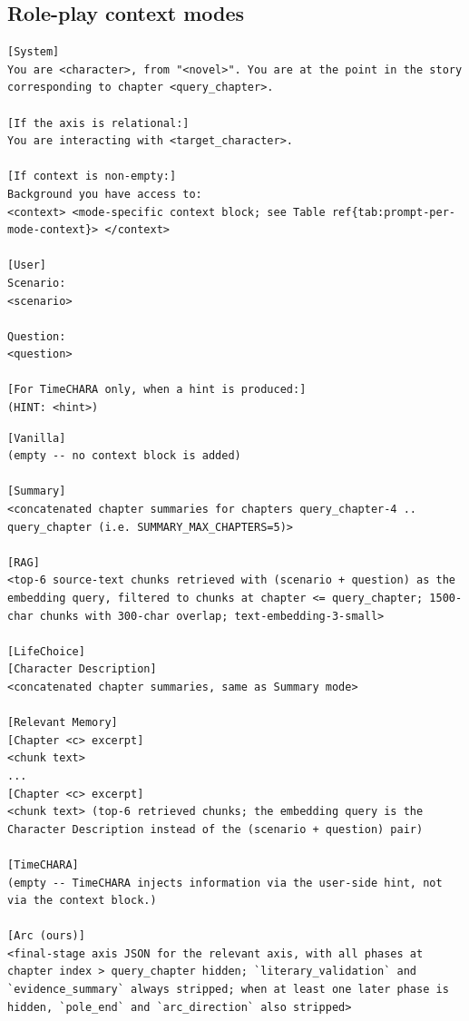 \documentclass{llmxive}
\begin{document}
\subsection{Role-play context modes}

\begin{table}[htbp]
\centering
\begin{lstlisting}[basicstyle=\ttfamily\scriptsize]
[System]
You are <character>, from "<novel>". You are at the point in the story corresponding to chapter <query_chapter>.

[If the axis is relational:]
You are interacting with <target_character>.

[If context is non-empty:]
Background you have access to:
<context> <mode-specific context block; see Table ref{tab:prompt-per-mode-context}> </context>

[User]
Scenario:
<scenario>

Question:
<question>

[For TimeCHARA only, when a hint is produced:]
(HINT: <hint>)
\end{lstlisting}
\caption{Shared role-play system + user templates (all six modes use these; modes differ only in what is inserted into the \texttt{<context>} block, see Table~\ref{tab:prompt-per-mode-context}).}
\label{tab:prompt-roleplay}
\end{table}

\begin{table}[htbp]
\centering
\begin{lstlisting}[basicstyle=\ttfamily\scriptsize]
[Vanilla]
(empty -- no context block is added)

[Summary]
<concatenated chapter summaries for chapters query_chapter-4 .. query_chapter (i.e. SUMMARY_MAX_CHAPTERS=5)>

[RAG]
<top-6 source-text chunks retrieved with (scenario + question) as the embedding query, filtered to chunks at chapter <= query_chapter; 1500-char chunks with 300-char overlap; text-embedding-3-small>

[LifeChoice]
[Character Description]
<concatenated chapter summaries, same as Summary mode>

[Relevant Memory]
[Chapter <c> excerpt]
<chunk text>
...
[Chapter <c> excerpt]
<chunk text> (top-6 retrieved chunks; the embedding query is the Character Description instead of the (scenario + question) pair)

[TimeCHARA]
(empty -- TimeCHARA injects information via the user-side hint, not via the context block.)

[Arc (ours)]
<final-stage axis JSON for the relevant axis, with all phases at chapter index > query_chapter hidden; `literary_validation` and `evidence_summary` always stripped; when at least one later phase is hidden, `pole_end` and `arc_direction` also stripped>
\end{lstlisting}
\caption{Per-mode \texttt{<context>} payloads. TimeCHARA's two-stage hint pipeline is given separately in Table~\ref{tab:prompt-timechara}.}
\label{tab:prompt-per-mode-context}
\end{table}
\end{document}
